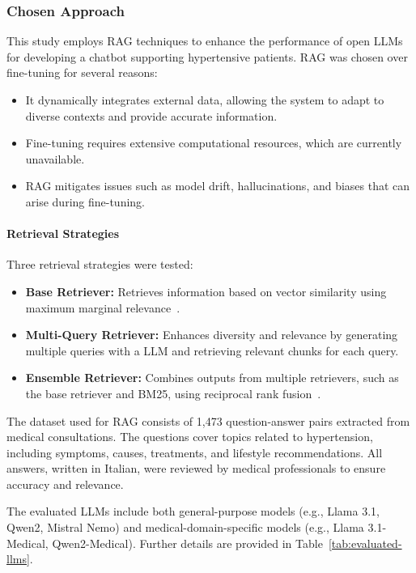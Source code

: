 \subsubsection{Chosen Approach}
%

%
This study employs \gls{RAG} techniques to enhance the performance of open \glspl{LLM} for developing a chatbot supporting hypertensive patients.
%
\gls{RAG} was chosen over fine-tuning for several reasons:
%
\begin{itemize}
    \item It dynamically integrates external data, allowing the system to adapt to diverse contexts and provide accurate information.
    \item Fine-tuning requires extensive computational resources, which are currently unavailable.
    \item \gls{RAG} mitigates issues such as model drift, hallucinations, and biases that can arise during fine-tuning.
\end{itemize}

\paragraph{Retrieval Strategies}
Three retrieval strategies were tested:
%
\begin{itemize}
    \item \textbf{Base Retriever:} Retrieves information based on vector similarity using maximum marginal relevance~\cite{DBLP:conf/sigir/CarbonellG98}.
    \item \textbf{Multi-Query Retriever:} Enhances diversity and relevance by generating multiple queries with a \gls{LLM} and retrieving relevant chunks for each query.
    \item \textbf{Ensemble Retriever:} Combines outputs from multiple retrievers, such as the base retriever and BM25, using reciprocal rank fusion~\cite{DBLP:conf/sigir/CormackCB09}.
\end{itemize}

The dataset used for \gls{RAG} consists of 1,473 question-answer pairs extracted from medical consultations.
%
The questions cover topics related to hypertension, including symptoms, causes, treatments, and lifestyle recommendations.
%
All answers, written in Italian, were reviewed by medical professionals to ensure accuracy and relevance.

The evaluated \glspl{LLM} include both general-purpose models (e.g., Llama 3.1, Qwen2, Mistral Nemo) and medical-domain-specific models (e.g., Llama 3.1-Medical, Qwen2-Medical).
%
Further details are provided in Table~\ref{tab:evaluated-llms}.



